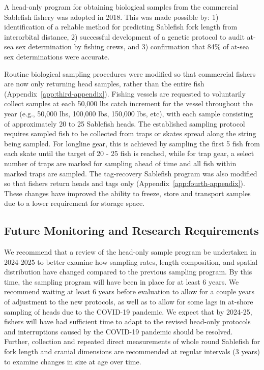 \documentclass[12pt]{article}\usepackage[]{graphicx}\usepackage[]{color}
\begin{document}
A head-only program for obtaining biological samples from the commercial Sablefish fishery was adopted in 2018. This was made possible by: 1) identification of a reliable method for predicting Sablefish fork length from interorbital distance, 2) successful development of a genetic protocol to audit at-sea sex determination by fishing crews, and 3) confirmation that 84\% of at-sea sex determinations were accurate.

Routine biological sampling procedures were modified so that commercial fishers are now only returning head samples, rather than the entire fish (Appendix~\ref{app:third-appendix}). Fishing vessels are requested to voluntarily collect samples at each 50,000 lbs catch increment for the vessel throughout the year (e.g., 50,000 lbs, 100,000 lbs, 150,000 lbs, etc), with each sample consisting of approximately 20 to 25 Sablefish heads. The established sampling protocol requires sampled fish to be collected from traps or skates spread along the string being sampled. For longline gear, this is achieved by sampling the first 5 fish from each skate until the target of 20 - 25 fish is reached, while for trap gear, a select number of traps are marked for sampling ahead of time and all fish within marked traps are sampled. The tag-recovery Sablefish program was also modified so that fishers return heads and tags only (Appendix~\ref{app:fourth-appendix}). These changes have improved the ability to freeze, store and transport samples due to a lower requirement for storage space.

\hypertarget{future-monitoring-and-research-requirements}{%
\subsection{Future Monitoring and Research Requirements}\label{future-monitoring-and-research-requirements}}

We recommend that a review of the head-only sample program be undertaken in 2024-2025 to better examine how sampling rates, length composition, and spatial distribution have changed compared to the previous sampling program. By this time, the sampling program will have been in place for at least 6 years. We recommend waiting at least 6 years before evaluation to allow for a couple years of adjustment to the new protocols, as well as to allow for some lags in at-shore sampling of heads due to the COVID-19 pandemic. We expect that by 2024-25, fishers will have had sufficient time to adapt to the revised head-only protocols and interruptions caused by the COVID-19 pandemic should be resolved. Further, collection and repeated direct measurements of whole round Sablefish for fork length and cranial dimensions are recommended at regular intervals (3 years) to examine changes in size at age over time.
\end{document}
